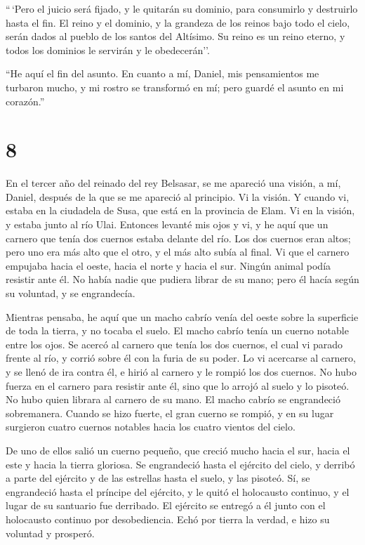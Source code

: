  ``\,`Pero el juicio será fijado, y le quitarán su
dominio, para consumirlo y destruirlo hasta el fin.  El
reino y el dominio, y la grandeza de los reinos bajo todo el cielo,
serán dados al pueblo de los santos del Altísimo. Su reino es un reino
eterno, y todos los dominios le servirán y le obedecerán''.

 ``He aquí el fin del asunto. En cuanto a mí, Daniel, mis
pensamientos me turbaron mucho, y mi rostro se transformó en mí; pero
guardé el asunto en mi corazón.''

\hypertarget{section-7}{%
\section{8}\label{section-7}}

 En el tercer año del reinado del rey Belsasar, se me
apareció una visión, a mí, Daniel, después de la que se me apareció al
principio.  Vi la visión. Y cuando vi, estaba en la
ciudadela de Susa, que está en la provincia de Elam. Vi en la visión, y
estaba junto al río Ulai.  Entonces levanté mis ojos y vi,
y he aquí que un carnero que tenía dos cuernos estaba delante del río.
Los dos cuernos eran altos; pero uno era más alto que el otro, y el más
alto subía al final.  Vi que el carnero empujaba hacia el
oeste, hacia el norte y hacia el sur. Ningún animal podía resistir ante
él. No había nadie que pudiera librar de su mano; pero él hacía según su
voluntad, y se engrandecía.

 Mientras pensaba, he aquí que un macho cabrío venía del
oeste sobre la superficie de toda la tierra, y no tocaba el suelo. El
macho cabrío tenía un cuerno notable entre los ojos.  Se
acercó al carnero que tenía los dos cuernos, el cual vi parado frente al
río, y corrió sobre él con la furia de su poder.  Lo vi
acercarse al carnero, y se llenó de ira contra él, e hirió al carnero y
le rompió los dos cuernos. No hubo fuerza en el carnero para resistir
ante él, sino que lo arrojó al suelo y lo pisoteó. No hubo quien librara
al carnero de su mano.  El macho cabrío se engrandeció
sobremanera. Cuando se hizo fuerte, el gran cuerno se rompió, y en su
lugar surgieron cuatro cuernos notables hacia los cuatro vientos del
cielo.

 De uno de ellos salió un cuerno pequeño, que creció mucho
hacia el sur, hacia el este y hacia la tierra gloriosa. 
Se engrandeció hasta el ejército del cielo, y derribó a parte del
ejército y de las estrellas hasta el suelo, y las pisoteó.
 Sí, se engrandeció hasta el príncipe del ejército, y le
quitó el holocausto continuo, y el lugar de su santuario fue derribado.
 El ejército se entregó a él junto con el holocausto
continuo por desobediencia. Echó por tierra la verdad, e hizo su
voluntad y prosperó.

